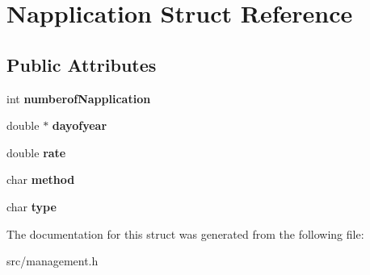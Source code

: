 \hypertarget{struct_napplication}{\section{Napplication Struct Reference}
\label{struct_napplication}
}
\subsection*{Public Attributes}
\begin{DoxyCompactItemize}
\item 
\hypertarget{struct_napplication_aaffc47a1bbe21bb926e4092d343c061d}{int {\bfseries numberof\-Napplication}}\label{struct_napplication_aaffc47a1bbe21bb926e4092d343c061d}

\item 
\hypertarget{struct_napplication_a075842ae6ec8bf50a0aacc047c9d3d7b}{double $\ast$ {\bfseries dayofyear}}\label{struct_napplication_a075842ae6ec8bf50a0aacc047c9d3d7b}

\item 
\hypertarget{struct_napplication_ad9beb4ed2696adefec1ba85f7bdd8527}{double {\bfseries rate}}\label{struct_napplication_ad9beb4ed2696adefec1ba85f7bdd8527}

\item 
\hypertarget{struct_napplication_a358f91d71d6df8ffde644ef83c07b2fa}{char {\bfseries method}}\label{struct_napplication_a358f91d71d6df8ffde644ef83c07b2fa}

\item 
\hypertarget{struct_napplication_a95cc868c37d775a338c0689814c12d97}{char {\bfseries type}}\label{struct_napplication_a95cc868c37d775a338c0689814c12d97}

\end{DoxyCompactItemize}


The documentation for this struct was generated from the following file\-:\begin{DoxyCompactItemize}
\item 
src/management.\-h\end{DoxyCompactItemize}
